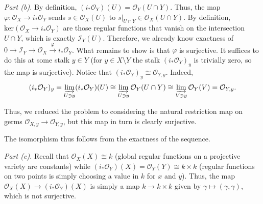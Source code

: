 \documentclass{template}
\begin{document}
\textcolor{blue!70!black}{\textit{Part (b).}} By definition,
$(i_*\mathcal{O}_Y)(U) = \mathcal{O}_Y(U \cap Y)$. Thus, the map $\varphi:
\mathcal{O}_X \to i_*\mathcal{O}_Y$ sends $s \in \mathcal{O}_X(U)$ to $s|_{U
\cap Y} \in \mathcal{O}_X(U \cap Y)$. By definition, $\text{ker}(\mathcal{O}_X
\to i_*\mathcal{O}_Y)$ are those regular functions that vanish on the
intersection $U \cap Y$, which is exactly $\mathcal{I}_Y(U)$. Therefore, we
already know exactness of $0 \to \mathcal{I}_Y \to \mathcal{O}_X
\xrightarrow{\varphi} i_*\mathcal{O}_Y$. What remains to show is that $\varphi$
is surjective. It suffices to do this at some stalk $y \in Y$ (for $y \in X
\setminus Y$ the stalk $(i_*\mathcal{O}_Y)_y$ is trivially zero, so the map is
surjective). Notice that $(i_*\mathcal{O}_Y)_y \cong \mathcal{O}_{Y,y}$. Indeed,
\begin{equation*}
    (i_*\mathcal{O}_Y)_y = \varinjlim_{U \ni y}(i_*\mathcal{O}_Y)(U) \cong \varinjlim_{U \ni y}\mathcal{O}_Y(U \cap Y) \cong \varinjlim_{V \ni y}\mathcal{O}_Y(V) = \mathcal{O}_{Y,y}.
\end{equation*}

Thus, we reduced the problem to considering the natural restriction map on germs
$\mathcal{O}_{X,y} \to \mathcal{O}_{Y,y}$, but this map in turn is clearly
surjective.

The isomorphism thus follows from the exactness of the sequence.

\textcolor{blue!70!black}{\textit{Part (c).}} Recall that $\mathcal{O}_X(X)
\cong k$ (global regular functions on a projective variety are constants) while
$(i_*\mathcal{O}_Y)(X) = \mathcal{O}_Y(Y) \cong k \times k$ (regular functions
on two points is simply choosing a value in $k$ for $x$ and $y$). Thus, the map
$\mathcal{O}_X(X) \to (i_*\mathcal{O}_Y)(X)$ is simply a map $k \to k \times k$
given by $\gamma \mapsto (\gamma,\gamma)$, which is not surjective.

\nocite{*}
\renewcommand{\refname}{}


\end{document}
